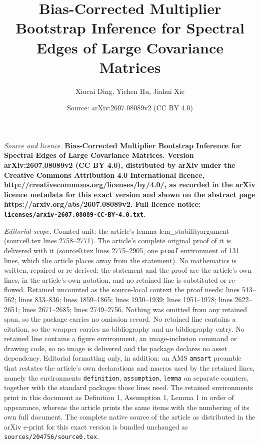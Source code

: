 \documentclass[10pt,a4paper]{amsart}
\title{\bf {Bias-Corrected Multiplier Bootstrap Inference for Spectral Edges of Large Covariance Matrices}}
\author{Xiucai Ding, Yichen Hu, Jiahui Xie}
\date{Source: arXiv:2607.08089v2 (CC BY 4.0)}
\begin{document}
\maketitle

\noindent\emph{Source and licence.} \bf {Bias-Corrected Multiplier Bootstrap Inference for Spectral Edges of Large Covariance Matrices}. Version arXiv:2607.08089v2 (CC BY 4.0), distributed by arXiv under the Creative Commons Attribution 4.0 International licence, http://creativecommons.org/licenses/by/4.0/, as recorded in the arXiv licence metadata for this exact version and shown on the abstract page https://arxiv.org/abs/2607.08089v2. Full licence notice: \texttt{licenses/arxiv-2607.08089-CC-BY-4.0.txt}.\par\smallskip

\noindent\textit{Editorial scope.} Counted unit: the article's lemma lem\_stabilityargument (source0.tex lines 2758--2771). The article's complete original proof of it is delivered with it (source0.tex lines 2775--2905, one \texttt{proof} environment of 131 lines, which the article places away from the statement). No mathematics is written, repaired or re-derived: the statement and the proof are the article's own lines, in the article's own notation, and no retained line is substituted or re-flowed.  Retained uncounted as the source-local context the proof needs: lines 543--562; lines 833--836; lines 1859--1865; lines 1930--1939; lines 1951--1978; lines 2622--2651; lines 2671--2685; lines 2749--2756.  Nothing was omitted from any retained span, so the package carries no omission record.  No retained line contains a citation, so the wrapper carries no bibliography and no bibliography entry.  No retained line contains a figure environment, an image-inclusion command or drawing code, so no image is delivered and the package declares no asset dependency.  Editorial formatting only, in addition: an AMS \texttt{amsart} preamble that restates the article's own declarations and macros used by the retained lines, namely the environments \texttt{definition}, \texttt{assumption}, \texttt{lemma} on separate counters, together with the standard packages those lines need.  The retained environments print in this document as Definition 1, Assumption 1, Lemma 1 in order of appearance, whereas the article prints the same items with the numbering of its own full document.  The complete native source of the article as distributed in the arXiv e-print for this exact version is bundled unchanged as \texttt{sources/204756/source0.tex}.
\end{document}
